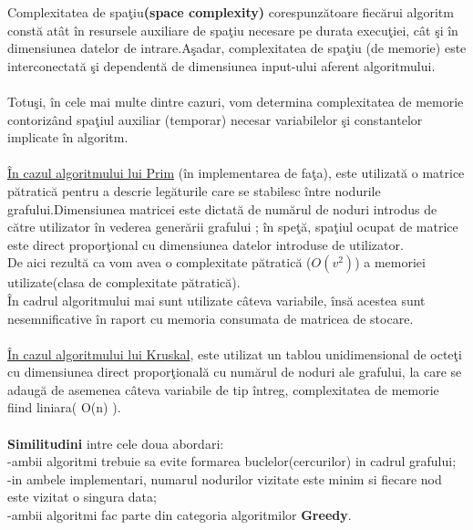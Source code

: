 \documentclass[14pt]{article}
\begin{document}
Complexitatea de spa\c tiu\textbf {(space complexity)} corespunz\u{a}toare fiec\u{a}rui algoritm const\u{a} at\^ at \^in resursele auxiliare de spa\c tiu necesare pe durata execu\c tiei, c\^ at \c si \^in dimensiunea datelor de intrare.A\c sadar, complexitatea de spa\c tiu (de memorie) este interconectat\u{a} \c si dependent\u{a} de dimensiunea input-ului aferent algoritmului.\\
\\
Totu\c si, \^in cele mai multe dintre cazuri, vom determina complexitatea de memorie contoriz\^and spa\c tiul auxiliar (temporar) necesar variabilelor \c si constantelor implicate \^in algoritm.\\
\\
\underline{\^In cazul algoritmului lui Prim} (\^in implementarea de fa\c ta), este utilizat\u{a} o matrice p\u{a}tratic\u{a} pentru a descrie leg\u{a}turile care se stabilesc \^intre nodurile grafului.Dimensiunea matricei este dictat\u{a} de num\u{a}rul de noduri introdus de c\u{a}tre utilizator \^in vederea gener\u{a}rii grafului ; \^in spe\c t\u{a}, spa\c tiul ocupat de matrice este direct propor\c tional cu dimensiunea datelor introduse de utilizator.\\De aici rezult\u{a} ca vom avea o complexitate p\u{a}tratic\u{a} ($O(v^2)$) a memoriei utilizate(clasa de complexitate p\u{a}tratic\u{a}).\\

\^In cadrul algoritmului mai sunt utilizate c\^ateva variabile, \^ins\u{a} acestea sunt nesemnificative \^in raport cu memoria consumata de matricea de stocare.\\
\\
\underline{\^In cazul algoritmului lui Kruskal}, este utilizat un tablou unidimensional de octe\c ti cu dimensiunea direct propor\c tional\u{a} cu num\u{a}rul de noduri ale grafului, la care se adaug\u{a} de asemenea c\^ateva variabile de tip \^intreg, complexitatea de memorie fiind liniara( O(n) ).\\
\\


\textbf{Similitudini} intre cele doua abordari:
\vspace{5mm}
\\
-ambii algoritmi trebuie sa evite formarea buclelor(cercurilor) in cadrul grafului;\\
-in ambele implementari, numarul nodurilor vizitate este minim si fiecare nod este vizitat o singura data;\\
-ambii algoritmi fac parte din categoria algoritmilor \textbf{Greedy}.
\end{document}
